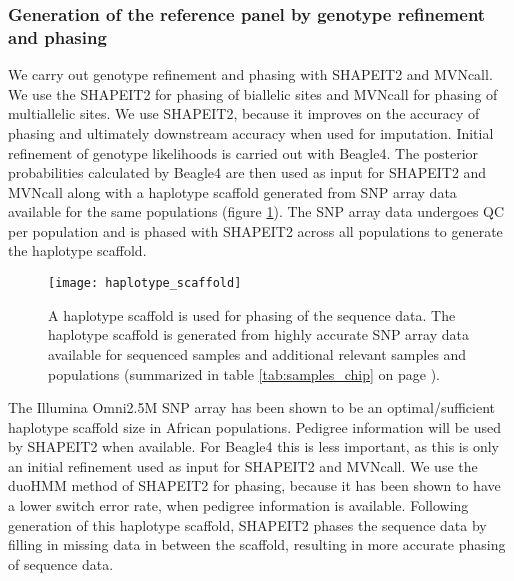 \subsubsection{Generation of the reference panel by genotype refinement and phasing}
\label{sec:refine_and_phase}
We carry out genotype refinement and phasing with SHAPEIT2\cite{Delaneau2012} and MVNcall.\cite{Menelaou2013} We use the SHAPEIT2 for phasing of biallelic sites and MVNcall for phasing of multiallelic sites. We use SHAPEIT2, because it improves on the accuracy of phasing\cite{2014Delaneau} and ultimately downstream accuracy when used for imputation\cite{2015Huang}. Initial refinement of genotype likelihoods is carried out with Beagle4.\cite{Browning20071084} The posterior probabilities calculated by Beagle4 are then used as input for SHAPEIT2 and MVNcall along with a haplotype scaffold generated from SNP array data available for the same populations (figure \ref{fig:haplotype_scaffold}). The SNP array data undergoes QC per population and is phased with SHAPEIT2 across all populations to generate the haplotype scaffold.

\begin{figure}[!htbp]
\centering
\texttt{[image: haplotype\_scaffold]}
\caption{A haplotype scaffold is used for phasing of the sequence data. The haplotype scaffold is generated from highly accurate SNP array data available for sequenced samples and additional relevant samples and populations (summarized in table \ref{tab:samples_chip} on page \pageref{tab:samples_chip}).}
\label{fig:haplotype_scaffold}
\end{figure}

The Illumina Omni2.5M SNP array has been shown to be an optimal/sufficient haplotype scaffold size in African populations.\cite{Menelaou2013}\cite{2014Delaneau} Pedigree information will be used by SHAPEIT2 when available. For Beagle4 this is less important, as this is only an initial refinement used as input for SHAPEIT2 and MVNcall. We use the duoHMM method of SHAPEIT2 for phasing, because it has been shown to have a lower switch error rate, when pedigree information is available.\cite{OConnell2014} Following generation of this haplotype scaffold, SHAPEIT2 phases the sequence data by filling in missing data in between the scaffold, resulting in more accurate phasing of sequence data.

